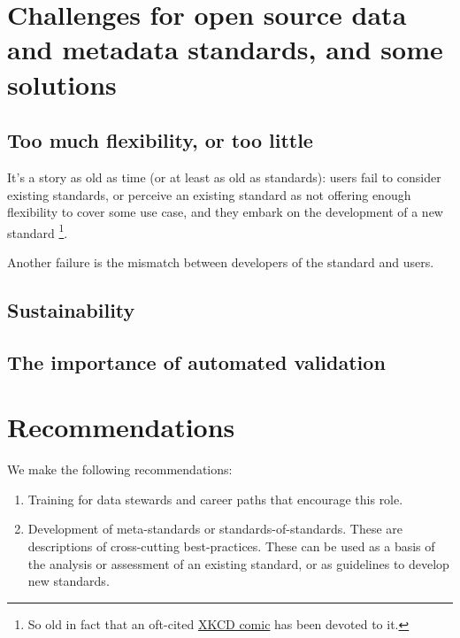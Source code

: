 \documentclass[
  letterpaper,
  DIV=11,
  numbers=noendperiod]{scrartcl}
\providecommand{\tightlist}{%
  \setlength{\itemsep}{0pt}\setlength{\parskip}{0pt}}\usepackage{longtable,booktabs,array}
\begin{document}
\section{Challenges for open source data and metadata standards, and
some
solutions}\label{challenges-for-open-source-data-and-metadata-standards-and-some-solutions}

\subsection{Too much flexibility, or too
little}\label{too-much-flexibility-or-too-little}

It's a story as old as time (or at least as old as standards): users
fail to consider existing standards, or perceive an existing standard as
not offering enough flexibility to cover some use case, and they embark
on the development of a new standard \footnote{So old in fact that an
  oft-cited \href{https://xkcd.com/927/}{XKCD comic} has been devoted to
  it.}.

Another failure is the mismatch between developers of the standard and
users.

\subsection{Sustainability}\label{sustainability}

\subsection{The importance of automated
validation}\label{the-importance-of-automated-validation}

\section{Recommendations}\label{recommendations}

We make the following recommendations:

\begin{enumerate}
\def\labelenumi{\arabic{enumi}.}
\tightlist
\item
  Training for data stewards and career paths that encourage this role.
\item
  Development of meta-standards or standards-of-standards. These are
  descriptions of cross-cutting best-practices. These can be used as a
  basis of the analysis or assessment of an existing standard, or as
  guidelines to develop new standards.
\end{enumerate}
\end{document}
